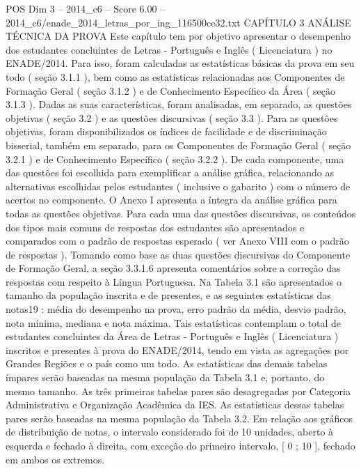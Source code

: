 \begin{textsample}{POS Dim 3 – 2014\_c6 – Score 6.00 – 2014\_c6/enade\_2014\_letras\_por\_ing\_116500ce32.txt}  \label{ex:f3_pos_034}
CAPÍTULO 3 ANÁLISE TÉCNICA DA PROVA Este capítulo tem por objetivo apresentar o desempenho dos estudantes concluintes de Letras - Português e Inglês ( Licenciatura ) no ENADE/2014.
Para isso, foram calculadas as estatísticas básicas da prova em seu todo ( seção 3.1.1 ), bem como as estatísticas relacionadas aos Componentes de Formação Geral ( seção 3.1.2 ) e de Conhecimento Específico da Área ( seção 3.1.3 ).
Dadas as suas características, foram analisadas, em separado, as questões objetivas ( seção 3.2 ) e as questões discursivas ( seção 3.3 ).
Para as questões objetivas, foram disponibilizados os índices de facilidade e de discriminação bisserial, também em separado, para os Componentes de Formação Geral ( seção 3.2.1 ) e de Conhecimento Específico ( seção 3.2.2 ).
De cada componente, uma das questões foi escolhida para exemplificar a análise gráfica, relacionando as alternativas escolhidas pelos estudantes ( inclusive o gabarito ) com o número de acertos no componente.
O Anexo I apresenta a íntegra da análise gráfica para todas as questões objetivas.
Para cada uma das questões discursivas, os conteúdos dos tipos mais comuns de respostas dos estudantes são apresentados e comparados com o padrão de respostas esperado ( ver Anexo VIII com o padrão de respostas ).
Tomando como base as duas questões discursivas do Componente de Formação Geral, a seção 3.3.1.6 apresenta comentários sobre a correção das respostas com respeito à Língua Portuguesa.
Na Tabela 3.1 são apresentados o tamanho da população inscrita e de presentes, e as seguintes estatísticas das notas19 : média do desempenho na prova, erro padrão da média, desvio padrão, nota mínima, mediana e nota máxima.
Tais estatísticas contemplam o total de estudantes concluintes da Área de Letras - Português e Inglês ( Licenciatura ) inscritos e presentes à prova do ENADE/2014, tendo em vista as agregações por Grandes Regiões e o país como um todo.
As estatísticas das demais tabelas ímpares serão baseadas na mesma população da Tabela 3.1 e, portanto, do mesmo tamanho.
As três primeiras tabelas pares são desagregadas por Categoria Administrativa e Organização Acadêmica da IES.
As estatísticas dessas tabelas pares serão baseadas na mesma população da Tabela 3.2.
Em relação aos gráficos de distribuição de notas, o intervalo considerado foi de 10 unidades, aberto à esquerda e fechado à direita, com exceção do primeiro intervalo, [ 0 ; 10 ], fechado em ambos os extremos.

\end{textsample}
